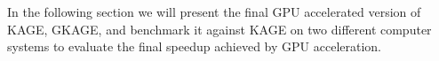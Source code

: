 In the following section we will present the final GPU accelerated version of KAGE, GKAGE, and benchmark it against KAGE on two different computer systems to evaluate the final speedup achieved by GPU acceleration.

